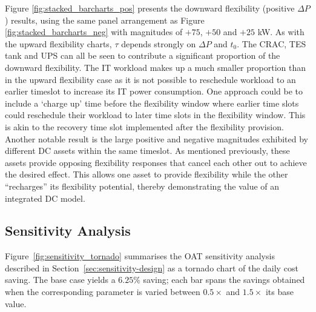\documentclass[lettersize,journal]{IEEEtran}
\newcommand{\rev}[1]{\textcolor{blue!70!black}{#1}}
\begin{document}
\rev{Figure \ref{fig:stacked_barcharts_pos} presents the downward flexibility (positive $\Delta P$) results, using the same panel arrangement as Figure \ref{fig:stacked_barcharts_neg} with magnitudes of $+75$, $+50$ and $+25$ kW.} As  with the upward flexibility charts, $\tau$ depends strongly on  $\Delta P$ and $t_0$. The CRAC, TES tank and UPS can all be seen to contribute a significant proportion of the downward flexibility. The IT workload makes up a much smaller proportion than in the upward flexibility case as it is not possible to reschedule workload to an earlier timeslot to increase its IT power consumption. One approach could be to include a `charge up' time before the flexibility window where earlier time slots could reschedule their workload to later time slots in the flexibility window. This is akin to the recovery time slot implemented after the flexibility provision. Another notable result is the large positive and negative magnitudes exhibited by different DC assets within the same timeslot. As mentioned previously, these assets provide opposing flexibility responses that cancel each other out to achieve the desired effect. This allows one asset to provide flexibility while the other ``recharges'' its flexibility potential, thereby demonstrating the value of an integrated DC model.

\subsection{\rev{Sensitivity Analysis}}\label{sec:sensitivity}
\rev{Figure~\ref{fig:sensitivity_tornado} summarises the OAT sensitivity analysis described in Section~\ref{sec:sensitivity-design} as a tornado chart of the daily cost saving. The base case yields a $6.25\%$ saving; each bar spans the savings obtained when the corresponding parameter is varied between $0.5\times$ and $1.5\times$ its base value.}
\end{document}
